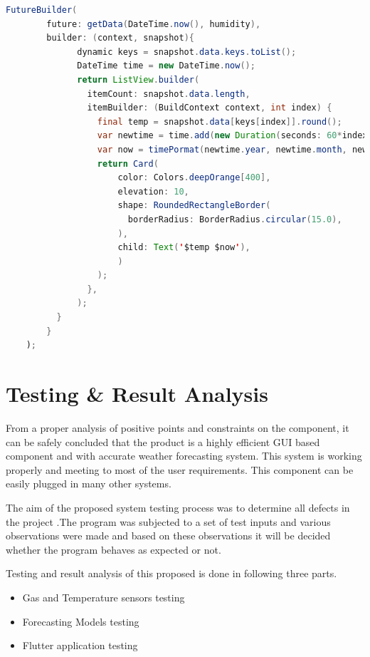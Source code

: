 \begin{lstlisting}[language=java, caption = Getting data from Weather API to flutter UI]
FutureBuilder(
        future: getData(DateTime.now(), humidity),
        builder: (context, snapshot){
              dynamic keys = snapshot.data.keys.toList();
              DateTime time = new DateTime.now();
              return ListView.builder(
                itemCount: snapshot.data.length,
                itemBuilder: (BuildContext context, int index) {
                  final temp = snapshot.data[keys[index]].round();
                  var newtime = time.add(new Duration(seconds: 60*index));
                  var now = timePormat(newtime.year, newtime.month, newtime.day, newtime.hour,newtime.minute);
                  return Card(
                      color: Colors.deepOrange[400],
                      elevation: 10,
                      shape: RoundedRectangleBorder(
                        borderRadius: BorderRadius.circular(15.0),
                      ),
                      child: Text('$temp $now'),
                      )
                  );
                },
              );
          }
        }
    );
\end{lstlisting}
\section{Testing \& Result Analysis}

From a proper analysis of positive points and constraints on the component, it can be safely concluded that the product is a highly efficient GUI based component and with accurate weather forecasting system. This system is working properly and meeting to most of the user requirements. This component can be easily plugged in many other systems.

The aim of the proposed system testing process was to determine all defects in the project .The program was subjected to a set of test inputs and various observations were made and based on these observations it will be decided whether the program behaves as expected or not.

Testing and result analysis of this proposed is done in following three parts.
\begin{itemize}
\item Gas and Temperature sensors testing
\item Forecasting Models testing
\item Flutter application testing
\end{itemize}

